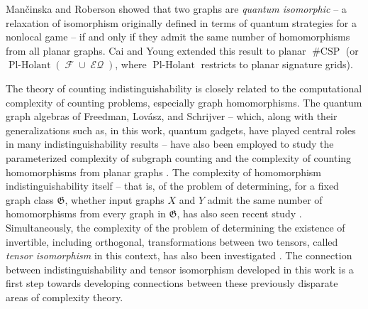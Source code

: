 \documentclass{theoretics}
\DeclareMathOperator{\fc}{\mathcal{F}}
\DeclareMathOperator{\plholant}{Pl-Holant}
\DeclareMathOperator{\csp}{\#CSP}
\DeclareMathOperator{\eq}{\mathcal{EQ}}
\begin{document}
Man\v{c}inska and Roberson \cite{planar} 
showed that two graphs are \emph{quantum isomorphic} -- a relaxation of isomorphism originally
defined in terms of quantum strategies for a nonlocal game \cite{nonsignalling}
-- if and only if they admit the same number of homomorphisms from all planar graphs.
Cai and Young \cite{cai_planar_2023} extended this result to
planar $\csp$ (or $\plholant(\fc \cup \eq)$, where $\plholant$ restricts to planar signature grids). 

The theory of counting indistinguishability is closely related to the computational complexity
of counting problems, especially graph homomorphisms. The quantum graph algebras of Freedman,
Lovász, and Schrijver \cite{freedman_reflection} -- which, along with their generalizations 
such as, in this work, quantum gadgets, have played central roles in many indistinguishability
results \cite{lovasz,schrijver,planar,grohe_homomorphism_2022,cai_planar_2023}
-- have also been employed to study the parameterized complexity of subgraph counting
\cite{curticapean2017homomorphisms,curticapean2024count} and the complexity of counting
homomorphisms from planar graphs \cite{cai_planar_2026}. The complexity of homomorphism
indistinguishability itself -- that is, of the problem of determining, for a fixed graph
class $\mathfrak{G}$, whether input graphs $X$ and $Y$ admit the same number of homomorphisms
from every graph in $\mathfrak{G}$, has also seen recent study \cite{seppelt2024algorithmic}.
Simultaneously, the complexity of the problem of determining the existence of invertible, 
including orthogonal, transformations between two tensors, called \emph{tensor isomorphism}
in this context, has also been investigated \cite{complexity_isomorphism1,complexity_isomorphism3}. The connection between indistinguishability and tensor isomorphism developed in this 
work is a first step towards developing connections between 
these previously disparate areas of complexity theory.
\end{document}

